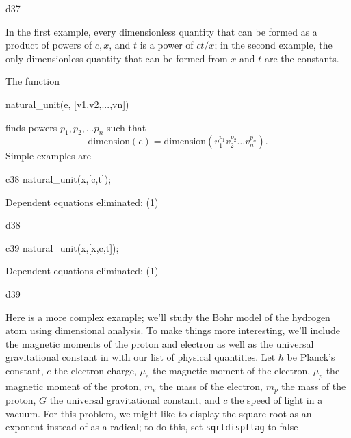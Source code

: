 \documentclass[12pt]{article}
\begin{document}
\begin{mdline}{d37}
\left[ 1 \right] 
\end{mdline}


\vspace{0.1in}

\noindent In the first example, every dimensionless quantity
that can be formed as a product of powers of $c,x$, and $t$ is
a power of $c t/x$; in the second example, the only
dimensionless quantity that can be formed from
$x$ and $t$ are the constants.

The function \begin{verb} natural_unit(e, [v1,v2,...,vn]) \end{verb}
 finds powers $p_1,p_2, \dots p_n$ such that
\[
  \mbox{dimension}(e) = \mbox{dimension} (v_1^{p_1} v_2^{p_2} \dots v_n^{p_n}).
\]
Simple examples are

\vspace{0.1in}



\begin{mcline}{c38}
natural_unit(x,[c,t]);
\end{mcline}


Dependent equations eliminated:  (1)


\begin{mdline}{d38}
   \left[ c\,t \right] 
\end{mdline}

\begin{mcline}{c39}
   natural_unit(x,[x,c,t]);
\end{mcline}


Dependent equations eliminated:  (1)


\begin{mdline}{d39}
   \left[ x \right] 
\end{mdline}


\vspace{0.1in}

Here is a more complex example; we'll study the Bohr model of
the hydrogen atom using dimensional analysis.  To make things
more interesting, we'll include the magnetic moments of the
proton and electron as well as the universal gravitational
constant in with our list of physical quantities. 
Let  $\hbar$ be Planck's constant, $e$ the electron charge, $\mu_e$ the
magnetic moment of the electron, $\mu_p$ the magnetic
moment of the proton, $m_e$ the mass of the electron, $m_p$
the mass of the proton, $G$ the universal gravitational constant,
 and $c$ the speed of light in a vacuum.  For this problem, we might 
like to display the square root as an exponent instead  of as a radical;
to do this, set {\tt sqrtdispflag} to false
\end{document}
